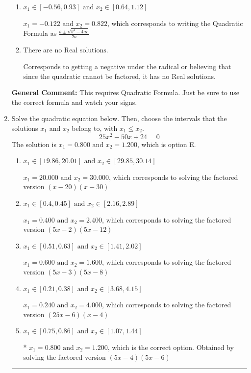 \documentclass{extbook}[14pt]
\newcommand{\litem}[1]{\item #1

\rule{\textwidth}{0.4pt}}
\begin{document}
\begin{enumerate}
{\begin{enumerate}[label=\Alph*.]
 $x_1 = -19.218 \text{ and } x_2 = 18.518$, which corresponds to writing the Quadratic Formula as $-\frac{b}{2a} \pm \sqrt{b^2 - 4ac}$.
\item \( x_1 \in [-0.56, 0.93] \text{ and } x_2 \in [0.64, 1.12] \)

 $x_1 = -0.122 \text{ and } x_2 = 0.822$, which corresponds to writing the Quadratic Formula as $\frac{b \pm \sqrt{b^2 - 4ac}}{2a}$
\item \( \text{There are no Real solutions.} \)

Corresponds to getting a negative under the radical or believing that since the quadratic cannot be factored, it has no Real solutions.
\end{enumerate}

\textbf{General Comment:} This requires Quadratic Formula. Just be sure to use the correct formula and watch your signs.
}
\litem{
Solve the quadratic equation below. Then, choose the intervals that the solutions $x_1$ and $x_2$ belong to, with $x_1 \leq x_2$.
\[ 25x^{2} -50 x + 24 = 0 \]The solution is \( x_1 = 0.800 \text{ and } x_2 = 1.200 \), which is option E.\begin{enumerate}[label=\Alph*.]
\item \( x_1 \in [19.86, 20.01] \text{ and } x_2 \in [29.85, 30.14] \)

$x_1 = 20.000 \text{ and } x_2 = 30.000$, which corresponds to solving the factored version $(x -20)(x -30)$
\item \( x_1 \in [0.4, 0.45] \text{ and } x_2 \in [2.16, 2.89] \)

$x_1 = 0.400 \text{ and } x_2 = 2.400$, which corresponds to solving the factored version $(5x -2)(5x -12)$
\item \( x_1 \in [0.51, 0.63] \text{ and } x_2 \in [1.41, 2.02] \)

$x_1 = 0.600 \text{ and } x_2 = 1.600$, which corresponds to solving the factored version $(5x -3)(5x -8)$
\item \( x_1 \in [0.21, 0.38] \text{ and } x_2 \in [3.68, 4.15] \)

$x_1 = 0.240 \text{ and } x_2 = 4.000$, which corresponds to solving the factored version $(25x -6)(x -4)$
\item \( x_1 \in [0.75, 0.86] \text{ and } x_2 \in [1.07, 1.44] \)

* $x_1 = 0.800 \text{ and } x_2 = 1.200$, which is the correct option. Obtained by solving the factored version $(5x -4)(5x -6)$
\end{enumerate}

}
\end{enumerate}
\end{document}
